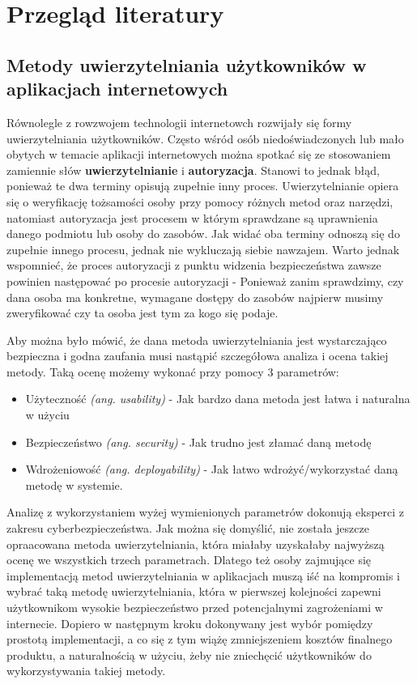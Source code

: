 \chapter{Przegląd literatury}
\section{Metody uwierzytelniania użytkowników w aplikacjach internetowych}
Równolegle z rowzwojem technologii internetowch rozwijały się formy uwierzytelniania użytkowników. Często wśród osób niedoświadczonych lub mało obytych w temacie aplikacji internetowych można spotkać się ze stosowaniem zamiennie słów \textbf{uwierzytelnianie} i \textbf{autoryzacja}. Stanowi to jednak błąd, ponieważ te dwa terminy opisują zupełnie inny proces. Uwierzytelnianie opiera się o weryfikację tożsamości osoby przy pomocy różnych metod oraz narzędzi, natomiast autoryzacja jest procesem w którym sprawdzane są uprawnienia danego podmiotu lub osoby do zasobów. Jak widać oba terminy odnoszą się do zupełnie innego procesu, jednak nie wykluczają siebie nawzajem. Warto jednak wspomnieć, że proces autoryzacji z punktu widzenia bezpieczeństwa zawsze powinien następować po procesie autoryzacji - Ponieważ zanim sprawdzimy, czy dana osoba ma konkretne, wymagane dostępy do zasobów najpierw musimy zweryfikować czy ta osoba jest tym za kogo się podaje.

Aby można było mówić, że dana metoda uwierzytelniania jest wystarczająco bezpieczna i godna zaufania musi nastąpić szczegółowa analiza i ocena takiej metody. Taką ocenę możemy wykonać przy pomocy 3 parametrów:
\begin{itemize}
  \item Użyteczność \emph{(ang. usability)} - Jak bardzo dana metoda jest łatwa i naturalna w użyciu
  \item Bezpieczeństwo \emph{(ang. security)} - Jak trudno jest złamać daną metodę
  \item Wdrożeniowość \emph{(ang. deployability)} - Jak łatwo wdrożyć/wykorzystać daną metodę w systemie.  
\end{itemize}

Analizę z wykorzystaniem wyżej wymienionych parametrów dokonują eksperci z zakresu cyberbezpieczeństwa. Jak można się domyślić, nie została jeszcze opraacowana metoda uwierzytelniania, która miałaby uzyskałaby najwyższą ocenę we wszystkich trzech parametrach. Dlatego też osoby zajmujące się implementacją metod uwierzytelniania w aplikacjach muszą iść na kompromis i wybrać taką metodę uwierzytelniania, która w pierwszej kolejności zapewni użytkownikom wysokie bezpieczeństwo przed potencjalnymi zagrożeniami w internecie. Dopiero w następnym kroku dokonywany jest wybór pomiędzy prostotą implementacji, a co się z tym wiążę zmniejszeniem kosztów finalnego produktu, a naturalnością w użyciu, żeby nie zniechęcić użytkowników do wykorzystywania takiej metody. 

